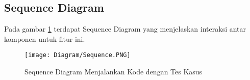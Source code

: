 \subsection{Sequence Diagram}

Pada gambar \ref{fig:3:sequence} terdapat Sequence Diagram yang menjelaskan interaksi antar komponen untuk fitur ini.

\begin{figure}[H]
	\centering  
	\texttt{[image: Diagram/Sequence.PNG]}  
	\caption{Sequence Diagram Menjalankan Kode dengan Tes Kasus}
	\label{fig:3:sequence} 
\end{figure} 
